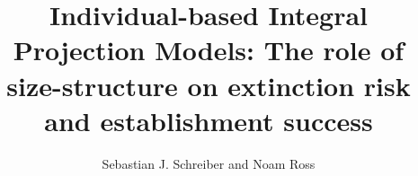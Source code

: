 \documentclass[12pt]{amsart}\usepackage[]{graphicx}\usepackage[]{color}
\begin{document}



\title[Extinction in Individual-based IPMs]{Individual-based Integral Projection Models: The role of size-structure on
  extinction risk and establishment success}
\author{Sebastian J. Schreiber and Noam Ross}
\address{Department of Evolution and Ecology, One Shields Avenue, University of California, Davis, California 95616}
\address{EcoHealth Alliance, 460 West 34th Street, 17th floor, New York, NY 10001}

\maketitle{}


\vspace{-7pt}
\end{document}
